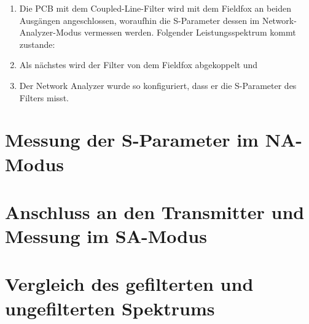 \begin{enumerate}
    \item Die PCB mit dem Coupled-Line-Filter wird mit dem Fieldfox an beiden Ausgängen angeschlossen, 
    woraufhin die S-Parameter dessen im Network-Analyzer-Modus vermessen werden. Folgender Leistungsspektrum kommt zustande:
    \item Als nächstes wird der Filter von dem Fieldfox abgekoppelt und
    \item Der Network Analyzer wurde so konfiguriert, dass er die S-Parameter des Filters misst.
\end{enumerate}
\section{Messung der S-Parameter im NA-Modus}
\section{Anschluss an den Transmitter und Messung im SA-Modus}
\section{Vergleich des gefilterten und ungefilterten Spektrums}

